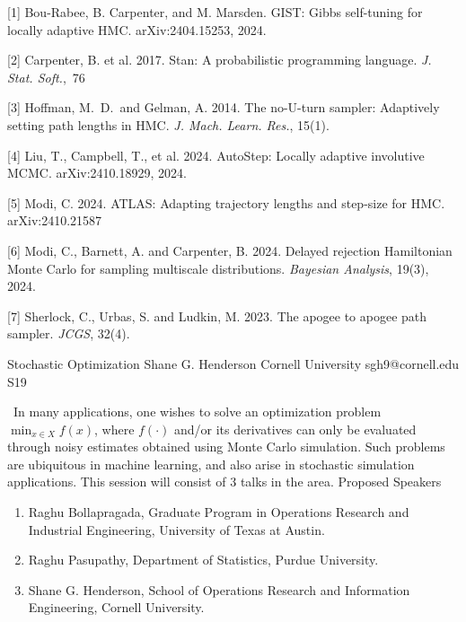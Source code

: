 \begin{session}
\begin{description}
 \item{[1]} Bou-Rabee, B. Carpenter, and M. Marsden. GIST: Gibbs self-tuning for locally adaptive HMC. arXiv:2404.15253, 2024.
 \item{[2]} Carpenter, B. et al. 2017. Stan: A probabilistic programming language. \textit{J. Stat. Soft.},~76
 \item{[3]} Hoffman, M.~D.\ and Gelman, A. 2014. The no-U-turn sampler: Adaptively setting path lengths in HMC. \textit{J. Mach. Learn. Res.}, 15(1).
 \item{[4]} Liu, T., Campbell, T., et al. 2024. AutoStep: Locally adaptive involutive MCMC. arXiv:2410.18929, 2024.
 \item{[5]} Modi, C. 2024. ATLAS: Adapting trajectory lengths and step-size for HMC. arXiv:2410.21587
 \item{[6]} Modi, C., Barnett, A. and Carpenter, B. 2024. Delayed rejection Hamiltonian Monte Carlo for sampling multiscale distributions. \textit{Bayesian Analysis}, 19(3), 2024.
 \item{[7]} Sherlock, C., Urbas, S. and Ludkin, M. 2023. The apogee to apogee path sampler. \textit{JCGS}, 32(4).
 \end{description}
\end{session}



\clearpage

\begin{session}
 {Stochastic Optimization}%
 {Shane G. Henderson}%
 {Cornell University}%
 {sgh9@cornell.edu}%
{}{}{}
 {S19}%
{}

 ~In many applications, one wishes to solve an optimization problem
 $\min_{x \in X} f(x)$, where $f(\cdot)$ and/or its derivatives can
 only be evaluated through noisy estimates obtained using Monte Carlo
 simulation. Such problems are ubiquitous in machine learning, and also
 arise in stochastic simulation applications. This session will consist
 of 3 talks in the area.
 Proposed Speakers
 \begin{enumerate}
 \item Raghu Bollapragada, Graduate Program in Operations Research and Industrial Engineering, University of Texas
 at Austin.
 \item Raghu Pasupathy, Department of Statistics, Purdue University.
 \item Shane G. Henderson, School of Operations Research and Information
 Engineering, Cornell University.
 \end{enumerate}
 \medskip
\end{session}

